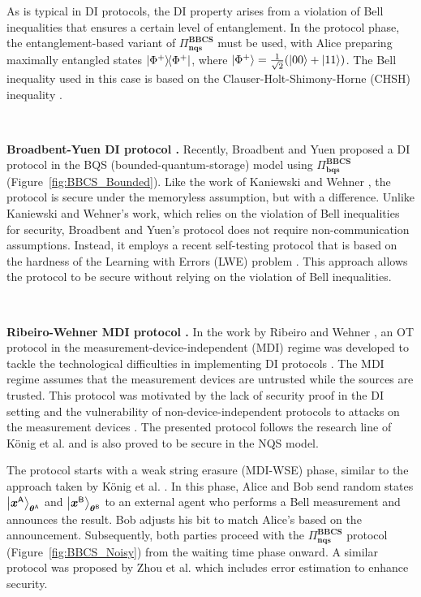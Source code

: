 As is typical in DI protocols, the DI property arises from a violation of Bell inequalities \cite{AGM06} that ensures a certain level of entanglement. In the protocol phase, the entanglement-based variant of $\Pi^{\textbf{BBCS}}_{\textbf{nqs}}$ must be used, with Alice preparing maximally entangled states $\ketbra{\Phi^+}$, where $\ket{\Phi^+} = \frac{1}{\sqrt{2}}(\ket{00} + \ket{11})$. The Bell inequality used in this case is based on the Clauser-Holt-Shimony-Horne (CHSH) inequality \cite{CHSH69}.


\

\noindent\textbf{Broadbent-Yuen DI protocol \cite{BY21}.} Recently, Broadbent and Yuen \cite{BY21} proposed a DI protocol in the BQS (bounded-quantum-storage) model using $\Pi^{\textbf{BBCS}}_{\textbf{bqs}}$ (Figure~\ref{fig:BBCS_Bounded}). Like the work of Kaniewski and Wehner \cite{KW16}, the protocol is secure under the memoryless assumption, but with a difference. Unlike Kaniewski and Wehner's work, which relies on the violation of Bell inequalities \cite{AGM06} for security, Broadbent and Yuen's protocol does not require non-communication assumptions. Instead, it employs a recent self-testing protocol \cite{MDC+21, MV21} that is based on the hardness of the Learning with Errors (LWE) problem \cite{P15}. This approach allows the protocol to be secure without relying on the violation of Bell inequalities.

\

\noindent\textbf{Ribeiro-Wehner MDI protocol \cite{RW20}.} In the work by Ribeiro and Wehner \cite{RW20}, an OT protocol in the measurement-device-independent (MDI) regime \cite{LCQ12} was developed to tackle the technological difficulties in implementing DI protocols \cite{MDR+19}. The MDI regime assumes that the measurement devices are untrusted while the sources are trusted. This protocol was motivated by the lack of security proof in the DI setting and the vulnerability of non-device-independent protocols to attacks on the measurement devices \cite{SRK+15}. The presented protocol follows the research line of K\"onig et al. \cite{KWW12} and is also proved to be secure in the NQS model.

The protocol starts with a weak string erasure (MDI-WSE) phase, similar to the approach taken by K\"onig et al. \cite{KWW12}. In this phase, Alice and Bob send random states $\ket{\bm{x}^{\mathsf{A}}}_{\bm{\theta}^{\mathsf{A}}}$ and $\ket{\bm{x}^{\mathsf{B}}}_{\bm{\theta}^{\mathsf{B}}}$ to an external agent who performs a Bell measurement and announces the result. Bob adjusts his bit to match Alice's based on the announcement. Subsequently, both parties proceed with the $\Pi^{\textbf{BBCS}}_{\textbf{nqs}}$ protocol (Figure~\ref{fig:BBCS_Noisy}) from the waiting time phase onward. A similar protocol was proposed by Zhou et al. \cite{ZGG+20} which includes error estimation to enhance security.

